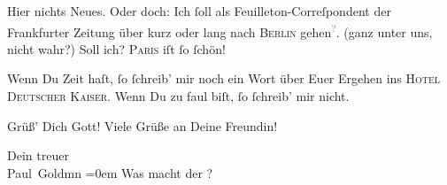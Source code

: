 \pstart
           Hier nichts Neues. Oder doch: Ich{ }ſoll als Feuilleton-Correſpondent der Frankfurter Zeitung über kurz oder lang nach \textsc{Berlin} gehen\substVorne{}\textsuperscript{\textcolor{gray}{?}}\substDazwischen{}.\substHinten{} (ganz unter uns, nicht wahr?) Soll ich? \textsc{Paris} iſt{ }ſo{ }ſchön!\pend
           
\pstart
           Wenn Du Zeit haſt,{ }ſo{ }ſchreib’ mir noch ein Wort über Euer Ergehen ins \textsc{Hotel Deutscher Kaiser}. Wenn Du zu faul biſt,{ }ſo{ }ſchreib’ mir nicht.\pend
           
\pstart
           Grüß’ Dich Gott! Viele Grüße an Deine Freundin!\pend
           
\pstart
           Dein treuer {\\[\baselineskip]}\spacefill\mbox{Paul Goldmn}\pend
           \leftskip=0em{}
\pstart
           \noindent{}Was macht der \label{K_L02810-5v}\label{K_L02810-5}?\pend
           \endnumbering{}  \newcommand{\dateiname}{L02810}\newcommand{\titel}{Paul Goldmann an Arthur Schnitzler, 28. 4. 1897}\newcommand{\editorInnen}{Martin Anton Müller und Laura Untner}
